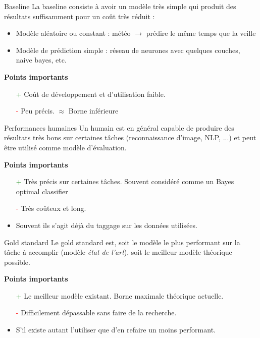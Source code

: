 \begin{frame}{Baseline}
La baseline consiste à avoir un modèle très simple qui produit des résultats suffisamment pour un coût très réduit :
\begin{itemize}
  \item Modèle aléatoire ou constant : météo $\rightarrow$ prédire le même temps que la veille
  \item Modèle de prédiction simple : réseau de neurones avec quelques couches, naive bayes, etc.
\end{itemize}

\textbf{Points importants}
\begin{itemize}
  \item[\textcolor{green}{+}] Coût de développement et d'utilisation faible. 
  \item[\textcolor{red}{-}] Peu précis. $\approx$ Borne inférieure
\end{itemize}
\end{frame}

\begin{frame}{Performances humaines}
  Un humain est en général capable de produire des résultats très bons sur certaines tâches (reconnaissance d'image, NLP, ...) et peut être utilisé comme modèle d'évaluation.

\textbf{Points importants}
\begin{itemize}
  \item[\textcolor{green}{+}] Très précis sur certaines tâches. Souvent considéré comme un Bayes optimal classifier 
  \item[\textcolor{red}{-}] Très coûteux et long.
  \item Souvent ils s'agit déjà du taggage sur les données utilisées. 
\end{itemize}
\end{frame}

\begin{frame}{Gold standard}
  Le gold standard est, soit le modèle le plus performant sur la tâche à accomplir (modèle \emph{état de l'art}), soit le meilleur modèle théorique possible.

\textbf{Points importants}
\begin{itemize}
  \item[\textcolor{green}{+}] Le meilleur modèle existant. Borne maximale théorique actuelle.
  \item[\textcolor{red}{-}] Difficilement dépassable sans faire de la recherche.
  \item S'il existe autant l'utiliser que d'en refaire un moins performant.
\end{itemize}
\end{frame}
